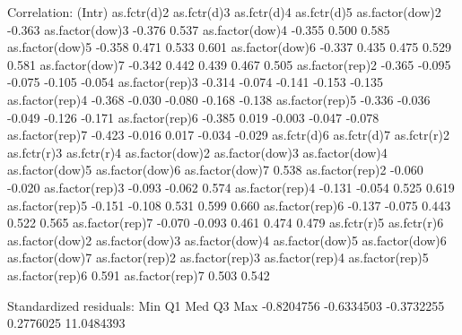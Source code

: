 \documentclass[11pt]{article}
\begin{document}
\begin{Schunk}
\begin{Soutput}
 Correlation: 
                (Intr) as.fctr(d)2 as.fctr(d)3 as.fctr(d)4 as.fctr(d)5
as.factor(dow)2 -0.363                                                
as.factor(dow)3 -0.376  0.537                                         
as.factor(dow)4 -0.355  0.500       0.585                             
as.factor(dow)5 -0.358  0.471       0.533       0.601                 
as.factor(dow)6 -0.337  0.435       0.475       0.529       0.581     
as.factor(dow)7 -0.342  0.442       0.439       0.467       0.505     
as.factor(rep)2 -0.365 -0.095      -0.075      -0.105      -0.054     
as.factor(rep)3 -0.314 -0.074      -0.141      -0.153      -0.135     
as.factor(rep)4 -0.368 -0.030      -0.080      -0.168      -0.138     
as.factor(rep)5 -0.336 -0.036      -0.049      -0.126      -0.171     
as.factor(rep)6 -0.385  0.019      -0.003      -0.047      -0.078     
as.factor(rep)7 -0.423 -0.016       0.017      -0.034      -0.029     
                as.fctr(d)6 as.fctr(d)7 as.fctr(r)2 as.fctr(r)3 as.fctr(r)4
as.factor(dow)2                                                            
as.factor(dow)3                                                            
as.factor(dow)4                                                            
as.factor(dow)5                                                            
as.factor(dow)6                                                            
as.factor(dow)7  0.538                                                     
as.factor(rep)2 -0.060      -0.020                                         
as.factor(rep)3 -0.093      -0.062       0.574                             
as.factor(rep)4 -0.131      -0.054       0.525       0.619                 
as.factor(rep)5 -0.151      -0.108       0.531       0.599       0.660     
as.factor(rep)6 -0.137      -0.075       0.443       0.522       0.565     
as.factor(rep)7 -0.070      -0.093       0.461       0.474       0.479     
                as.fctr(r)5 as.fctr(r)6
as.factor(dow)2                        
as.factor(dow)3                        
as.factor(dow)4                        
as.factor(dow)5                        
as.factor(dow)6                        
as.factor(dow)7                        
as.factor(rep)2                        
as.factor(rep)3                        
as.factor(rep)4                        
as.factor(rep)5                        
as.factor(rep)6  0.591                 
as.factor(rep)7  0.503       0.542     

Standardized residuals:
       Min         Q1        Med         Q3        Max 
-0.8204756 -0.6334503 -0.3732255  0.2776025 11.0484393 


\end{Soutput}
\end{Schunk}
\end{document}
